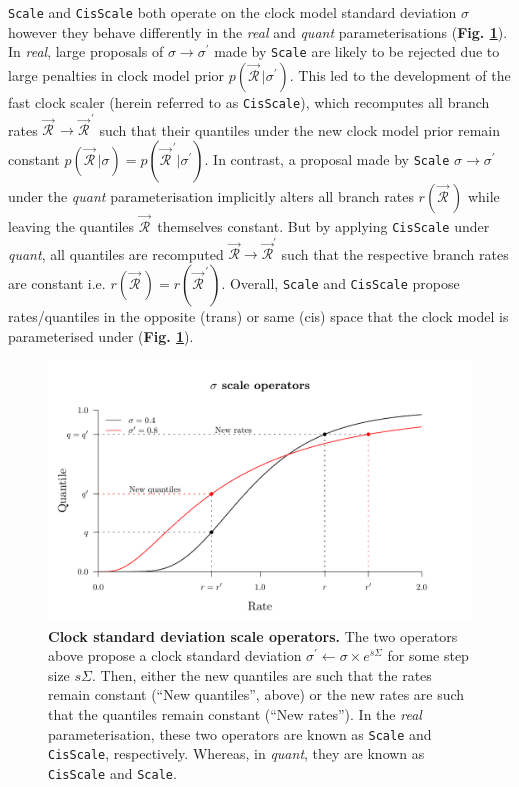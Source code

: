 \documentclass[10pt,letterpaper]{article}
\begin{document}
 \texttt{Scale} and \texttt{CisScale} both operate on the clock model standard deviation $\sigma$ however they behave differently in the \textit{real} and \textit{quant} parameterisations (\textbf{Fig. \ref{fig:clockSDoperators}}).
In \textit{real}, large proposals of $\sigma \rightarrow \sigma^\prime$ made by  \texttt{Scale} are likely to be rejected due to large penalties in clock model prior $p(\vec{\mathcal{R}}^{\,}|\sigma^\prime)$.
This led to the development of the fast clock scaler \cite{zhang2020improving} (herein referred to as \texttt{CisScale}), which recomputes all branch rates $\vec{\mathcal{R}}^{\,} \rightarrow \vec{\mathcal{R}}^{\, \prime}$ such that their quantiles under the new clock model prior remain constant $p(\vec{\mathcal{R}}^{\,}|\sigma) = p(\vec{\mathcal{R}}^{\, \prime}|\sigma^\prime)$.
In contrast, a proposal made by \texttt{Scale} $\sigma \rightarrow \sigma^\prime$ under the \textit{quant} parameterisation implicitly alters all branch rates $r(\vec{\mathcal{R}}^{\,})$ while leaving the quantiles $\vec{\mathcal{R}}^{\,}$ themselves constant.
But by applying \texttt{CisScale} under \textit{quant},
all quantiles are recomputed $\vec{\mathcal{R}} \rightarrow \vec{\mathcal{R}}^\prime$  such that the respective branch rates are constant i.e. $r(\vec{\mathcal{R}}^{\,}) = r(\vec{\mathcal{R}}^{\,\prime})$.
Overall, \texttt{Scale} and \texttt{CisScale} propose rates/quantiles in the opposite (trans) or same (cis) space that the clock model is parameterised under (\textbf{Fig. \ref{fig:clockSDoperators}}).




\begin{figure}[!h]
\centering
\includegraphics[width=\textwidth]{Figures/clockSD.pdf}
\caption{\textbf{Clock standard deviation scale operators.}
The two operators above propose a clock standard deviation $\sigma^\prime \leftarrow \sigma \times e^{s\Sigma}$ for some step size $s \Sigma$. 
Then, either the new quantiles are such that the rates remain constant (``New quantiles'', above) or the new rates are  such that the quantiles remain constant (``New rates''). 
In the \textit{real} parameterisation, these two operators are known as \texttt{Scale} and \texttt{CisScale}, respectively.
Whereas, in \textit{quant}, they are known as \texttt{CisScale} and \texttt{Scale}.    }
\label{fig:clockSDoperators}
\end{figure}
\end{document}
